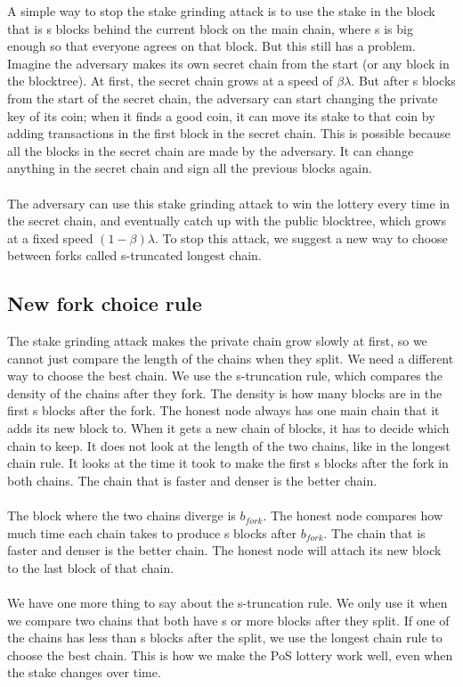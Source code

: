 A simple way to stop the stake grinding attack is to use the stake in the block that is s blocks behind the current block on the main chain, where s is big enough so that everyone agrees on that block. But this still has a problem. Imagine the adversary makes its own secret chain from the start (or any block in the blocktree). At first, the secret chain grows at a speed of $\beta\lambda$. But after s blocks from the start of the secret chain, the adversary can start changing the private key of its coin; when it finds a good coin, it can move its stake to that coin by adding transactions in the first block in the secret chain. This is possible because all the blocks in the secret chain are made by the adversary. It can change anything in the secret chain and sign all the previous blocks again.\\\\
The adversary can use this stake grinding attack to win the lottery every time in the secret chain, and eventually catch up with the public blocktree, which grows at a fixed speed $(1 - \beta)\lambda$. To stop this attack, we suggest a new way to choose between forks called s-truncated longest chain.

\subsection{New fork choice rule}
The stake grinding attack makes the private chain grow slowly at first, so we cannot just compare the length of the chains when they split. We need a different way to choose the best chain. We use the s-truncation rule, which compares the density of the chains after they fork. The density is how many blocks are in the first s blocks after the fork. The honest node always has one main chain that it adds its new block to. When it gets a new chain of blocks, it has to decide which chain to keep. It does not look at the length of the two chains, like in the longest chain rule. It looks at the time it took to make the first s blocks after the fork in both chains. The chain that is faster and denser is the better chain.\\\\
The block where the two chains diverge is $b_{fork}$. The honest node compares how much time each chain takes to produce s blocks after $b_{fork}$. The chain that is faster and denser is the better chain. The honest node will attach its new block to the last block of that chain.\\\\
We have one more thing to say about the s-truncation rule. We only use it when we compare two chains that both have s or more blocks after they split. If one of the chains has less than s blocks after the split, we use the longest chain rule to choose the best chain. This is how we make the PoS lottery work well, even when the stake changes over time.

